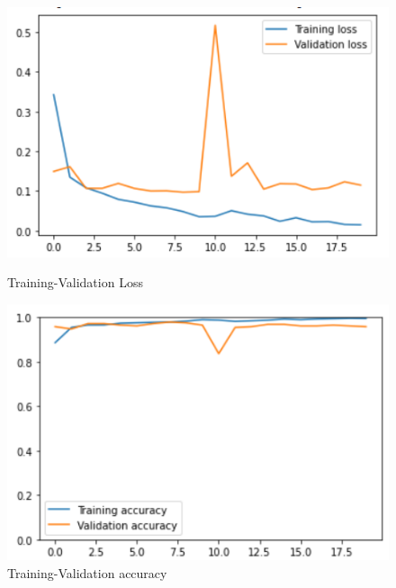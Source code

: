 \documentclass[11pt,a4paper]{article}
\theoremstyle{definition}
\begin{document}
\begin{figure}[H]
  \centering
  \begin{minipage}[b]{0.45\textwidth}
    \includegraphics[scale=0.75]{./images/v2loss}
	\caption{Training-Validation Loss}
  \end{minipage}
  \hfill
  \begin{minipage}[b]{0.45\textwidth}
    \includegraphics[scale=0.75]{./images/v2acc}
	\caption{Training-Validation accuracy}
  \end{minipage}
\end{figure}
\end{document}
